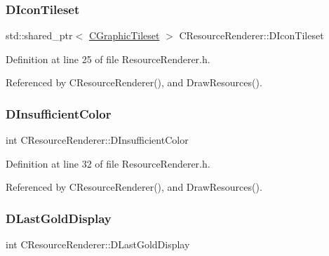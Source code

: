 \subsubsection{\texorpdfstring{D\+Icon\+Tileset}{DIconTileset}}
{\footnotesize\ttfamily std\+::shared\+\_\+ptr$<$ \hyperlink{classCGraphicTileset}{C\+Graphic\+Tileset} $>$ C\+Resource\+Renderer\+::\+D\+Icon\+Tileset\hspace{0.3cm}{\ttfamily [protected]}}



Definition at line 25 of file Resource\+Renderer.\+h.



Referenced by C\+Resource\+Renderer(), and Draw\+Resources().

\hypertarget{classCResourceRenderer_a628700620a91412c1624fae0db8a9ebb}{}\label{classCResourceRenderer_a628700620a91412c1624fae0db8a9ebb} 
\subsubsection{\texorpdfstring{D\+Insufficient\+Color}{DInsufficientColor}}
{\footnotesize\ttfamily int C\+Resource\+Renderer\+::\+D\+Insufficient\+Color\hspace{0.3cm}{\ttfamily [protected]}}



Definition at line 32 of file Resource\+Renderer.\+h.



Referenced by C\+Resource\+Renderer(), and Draw\+Resources().

\hypertarget{classCResourceRenderer_ae96b899e2b8f19105a6e5d1e2f741abd}{}\label{classCResourceRenderer_ae96b899e2b8f19105a6e5d1e2f741abd} 
\subsubsection{\texorpdfstring{D\+Last\+Gold\+Display}{DLastGoldDisplay}}
{\footnotesize\ttfamily int C\+Resource\+Renderer\+::\+D\+Last\+Gold\+Display\hspace{0.3cm}{\ttfamily [protected]}}



